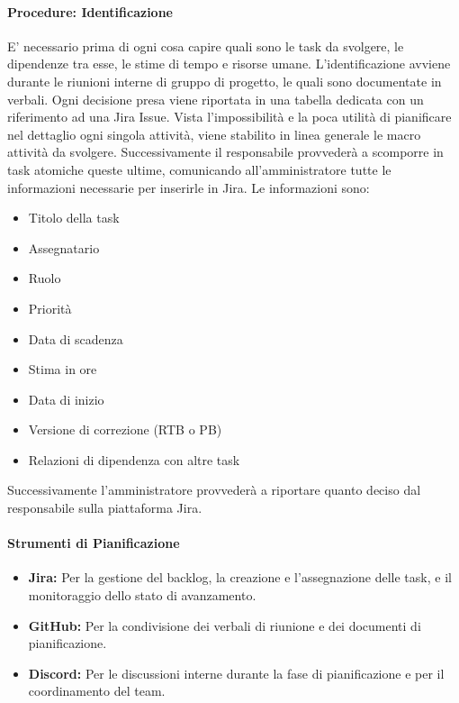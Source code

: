 \documentclass[a4paper,12pt]{article}
\begin{document}
\paragraph{Procedure: Identificazione}
E' necessario prima di ogni cosa capire quali sono le task da svolgere, le dipendenze tra esse, le stime di tempo e risorse umane.
L'identificazione avviene durante le riunioni interne di gruppo di progetto, le quali sono documentate in verbali. Ogni decisione presa viene riportata in una tabella dedicata con un riferimento ad una Jira Issue.
Vista l'impossibilità e la poca utilità di pianificare nel dettaglio ogni singola attività, viene stabilito in linea generale le macro attività da svolgere. Successivamente il responsabile provvederà a scomporre in task
atomiche queste ultime, comunicando all'amministratore tutte le informazioni necessarie per inserirle in Jira. Le informazioni sono:
\begin{itemize}
    \item Titolo della task
    \item Assegnatario
    \item Ruolo
    \item Priorità
    \item Data di scadenza
    \item Stima in ore
    \item Data di inizio
    \item Versione di correzione (RTB o PB)
    \item Relazioni di dipendenza con altre task
\end{itemize}

Successivamente l'amministratore provvederà a riportare quanto deciso dal responsabile sulla piattaforma Jira.

\paragraph{Strumenti di Pianificazione}
\begin {itemize}
    \item \textbf{Jira:} Per la gestione del backlog, la creazione e l'assegnazione delle task, e il monitoraggio dello stato di avanzamento.
    \item \textbf{GitHub:} Per la condivisione dei verbali di riunione e dei documenti di pianificazione.
    \item \textbf{Discord:} Per le discussioni interne durante la fase di pianificazione e per il coordinamento del team.
\end{itemize}
\end{document}
